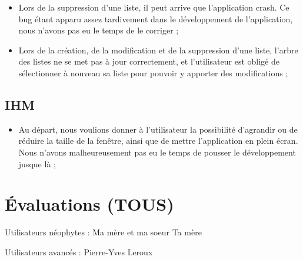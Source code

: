 		\begin{itemize}
			\item Lors de la suppression d'une liste, il peut arrive que l'application crash. Ce bug étant apparu assez tardivement dans le développement de l'application, nous n'avons pas eu le temps de le corriger ;
			\item Lors de la création, de la modification et de la suppression d'une liste, l'arbre des listes ne se met pas à jour correctement, et l'utilisateur est obligé de sélectionner à nouveau sa liste pour pouvoir y apporter des modifications ;
		\end{itemize}
		
		
	\section{IHM}
	
		\begin{itemize}
			\item Au départ, nous voulions donner à l'utilisateur la possibilité d'agrandir ou de réduire la taille de la fenêtre, ainsi que de mettre l'application en plein écran. Nous n'avons malheureusement pas eu le temps de pousser le développement jusque là ;
		\end{itemize}


\chapter{Évaluations (TOUS)}
	
	Utilisateurs néophytes :
		Ma mère et ma soeur
		Ta mère
		
	Utilisateurs avancés :
		Pierre-Yves
		Leroux

